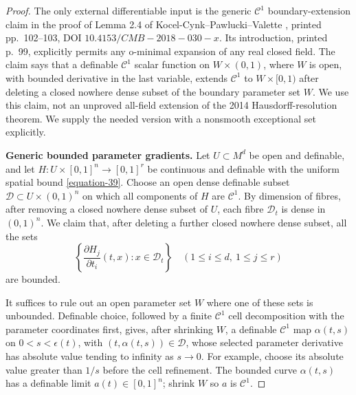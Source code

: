 \documentclass[11pt,a4paper]{article}
\theoremstyle{definition}
\begin{document}
\begin{proof}
The only external differentiable input is the generic
\(\mathcal C^1\) boundary-extension claim in the proof of Lemma 2.4 of
Kocel-Cynk--Pawlucki--Valette \cite{KocelCynkPawluckiValette2019},
printed pp.~102--103, DOI \(10.4153/CMB-2018-030-x\).
Its introduction, printed p.~99, explicitly permits any o-minimal
expansion of any real closed field. The claim says that a definable
\(\mathcal C^1\) scalar function on \(W\times(0,1)\), where \(W\) is
open, with bounded derivative in the last variable, extends
\(\mathcal C^1\) to \(W\times[0,1)\) after deleting a closed nowhere
dense subset of the boundary parameter set \(W\). We use this claim,
not an unproved all-field extension of the 2014 Hausdorff-resolution
theorem. We supply the needed version with a nonsmooth exceptional
set explicitly.

\textbf{Generic bounded parameter gradients.}
Let \(U\subset M^d\) be open and definable, and let
\(H:U\times[0,1]^n\to[0,1]^r\) be continuous and definable with the
uniform spatial bound \eqref{equation-39}. Choose an open dense definable subset
\(\mathcal D\subset U\times(0,1)^n\) on which all components of \(H\)
are \(\mathcal C^1\). By dimension of fibres, after removing a closed
nowhere dense subset of \(U\), each fibre
\(\mathcal D_t\) is dense in \((0,1)^n\).
We claim that, after deleting a further closed nowhere dense subset,
all the sets
\begin{equation}
 \left\{\frac{\partial H_j}{\partial t_i}(t,x):
                   x\in\mathcal D_t\right\}
 \quad(1\le i\le d,\ 1\le j\le r)
 \label{equation-41}
\end{equation}
are bounded.

It suffices to rule out an open parameter set \(W\) where one of
these sets is unbounded. Definable choice, followed by a finite
\(\mathcal C^1\) cell decomposition with the parameter coordinates
first, gives, after shrinking \(W\), a definable \(\mathcal C^1\) map
\(\alpha(t,s)\) on \(0<s<\epsilon(t)\), with
\((t,\alpha(t,s))\in\mathcal D\), whose selected parameter derivative
has absolute value tending to infinity as \(s\to0\).
For example, choose its absolute value greater than \(1/s\) before
the cell refinement. The bounded curve \(\alpha(t,s)\) has a
definable limit \(a(t)\in[0,1]^n\); shrink \(W\) so \(a\) is
\(\mathcal C^1\).


\end{proof}
\end{document}
